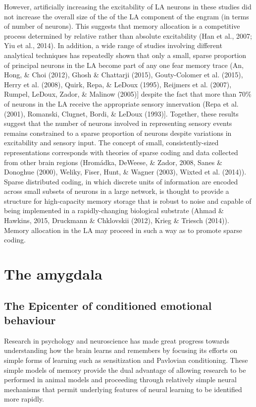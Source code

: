 \documentclass[12pt,a4paper,]{report}
\begin{document}
However, artificially increasing the excitability of LA neurons in these
studies did not increase the overall size of the of the LA component of
the engram (in terms of number of neurons). This suggests that memory
allocation is a competitive process determined by relative rather than
absolute excitability (Han et al., 2007; Yiu et al., 2014). In addition,
a wide range of studies involving different analytical techniques has
repeatedly shown that only a small, sparse proportion of principal
neurons in the LA become part of any one fear memory trace (An, Hong, \&
Choi (2012), Ghosh \& Chattarji (2015), Gouty-Colomer et al. (2015),
Herry et al. (2008), Quirk, Repa, \& LeDoux (1995), Reijmers et al.
(2007), Rumpel, LeDoux, Zador, \& Malinow (2005){]} despite the fact
that more than 70\% of neurons in the LA receive the appropriate sensory
innervation (Repa et al. (2001), Romanski, Clugnet, Bordi, \& LeDoux
(1993){]}. Together, these results suggest that the number of neurons
involved in representing sensory events remains constrained to a sparse
proportion of neurons despite variations in excitability and sensory
input. The concept of small, consistently-sized representations
corresponds with theories of sparse coding and data collected from other
brain regions (Hromádka, DeWeese, \& Zador, 2008, Sanes \& Donoghue
(2000), Weliky, Fiser, Hunt, \& Wagner (2003), Wixted et al. (2014)).
Sparse distributed coding, in which discrete units of information are
encoded across small subsets of neurons in a large network, is thought
to provide a structure for high-capacity memory storage that is robust
to noise and capable of being implemented in a rapidly-changing
biological substrate (Ahmad \& Hawkins, 2015, Druckmann \& Chklovskii
(2012), Krieg \& Triesch (2014)). Memory allocation in the LA may
proceed in such a way as to promote sparse coding.

\section{The amygdala}\label{the-amygdala}

\subsection{The Epicenter of conditioned emotional
behaviour}\label{the-epicenter-of-conditioned-emotional-behaviour}

Research in psychology and neuroscience has made great progress towards
understanding how the brain learns and remembers by focusing its efforts
on simple forms of learning such as sensitization and Pavlovian
conditioning. These simple models of memory provide the dual advantage
of allowing research to be performed in animal models and proceeding
through relatively simple neural mechanisms that permit underlying
features of neural learning to be identified more rapidly.
\end{document}

